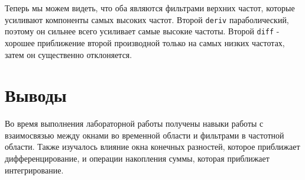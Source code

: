 \documentclass[a4paper,12pt]{report}
\begin{document}
Теперь мы можем видеть, что оба являются фильтрами верхних частот, которые усиливают компоненты самых высоких частот. Второй \texttt{deriv} параболический, поэтому он сильнее всего усиливает самые высокие частоты. Второй \texttt{diff} - хорошее приближение второй производной только на самых низких частотах, затем он существенно отклоняется.

\chapter{Выводы}

Во время выполнения лабораторной работы получены навыки работы с взаимосвязью между окнами во временной области и фильтрами в частотной области. Также изучалось влияние окна конечных разностей, которое приближает дифференцирование, и операции накопления суммы, которая приближает интегрирование.
\end{document}
